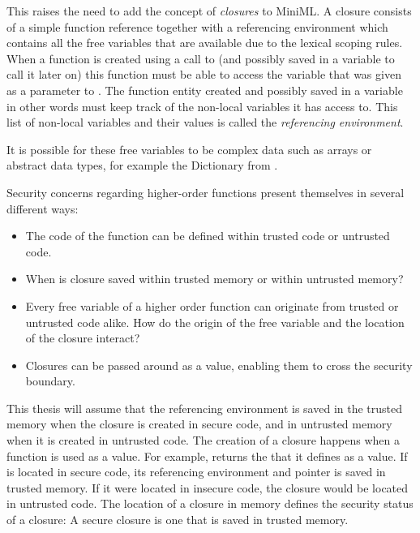 \documentclass[10pt,a4paper,master=cws, masteroption=ai,english,inputenc=utf8]{kulemt}
\begin{document}
%


This raises the need to add the concept of \emph{closures} to \mbox{MiniML}.
A closure consists of a simple function reference together with a referencing environment which contains all the free variables that are available due to the lexical scoping rules.
When a function is created using a call to  (and possibly saved in a variable to call it later on) this function must be able to access the variable  that was given as a parameter to .
The function entity created and possibly saved in a variable in other words must keep track of the non-local variables it has access to.
This list of non-local variables and their values is called the \emph{referencing environment}.

It is possible for these free variables to be complex data such as arrays or abstract data types, for example the Dictionary from . 

Security concerns regarding higher-order functions present themselves in several different ways:

\begin{itemize}
\item The code of the function can be defined within trusted code or untrusted code.
\item When is closure saved within trusted memory or within untrusted memory?
\item Every free variable of a higher order function can originate from trusted or untrusted code alike.
How do the origin of the free variable and the location of the closure interact?
\item Closures can be passed around as a value, enabling them to cross the security boundary.
\end{itemize}

This thesis will assume that the referencing environment is saved in the trusted memory when the closure is created in secure code, and in untrusted memory when it is created in untrusted code.
The creation of a closure happens when a function is used as a value.
For example,  returns the  that it defines as a value.
If  is located in secure code, its referencing environment and pointer is saved in trusted memory.
If it were located in insecure code, the closure would be located in untrusted code.
The location of a closure in memory defines the security status of a closure: A secure closure is one that is saved in trusted memory.
\end{document}

